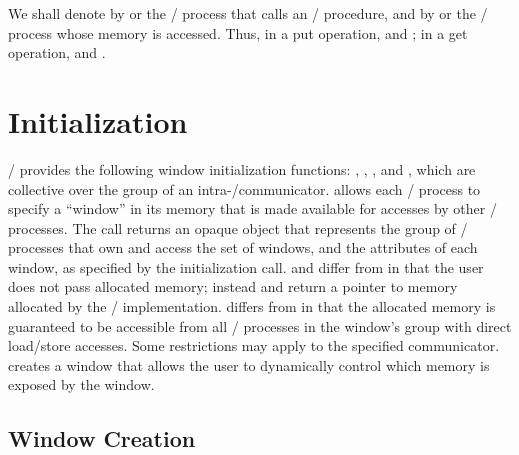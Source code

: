 We shall denote by  or  the \MPI/ process that calls an \RMA/ procedure,
and by  or  the \MPI/ process whose memory is accessed.
Thus, in a put
operation,  and ; in a
get operation,  and .

\section{Initialization}
\label{sec:one-side-2:intro}


\MPI/ provides
the following window initialization
functions: ,
,
,
and\flushline %
, which are collective over the group of an
intra\hyphen/communicator.
allows each \mpi/ process to specify a ``window'' in its
memory that is made available for accesses by other \mpi/
processes.
The call returns an opaque object
that represents the group of \mpi/
processes that own and access the set of windows,
and the attributes of each window, as specified by the initialization call.
 and  differ from
 in that the user does not pass allocated
memory; instead  and  return a
pointer to memory allocated by the \MPI/ implementation.
 differs from
 in that the allocated memory is guaranteed to be
accessible from all \mpi/ processes in the window's group with direct load/store accesses. Some
restrictions may apply to the specified communicator.
 creates a window that allows the
user to dynamically control which memory is exposed by the window.

\subsection{Window Creation}
\label{chap:one-side-2:win_create}

